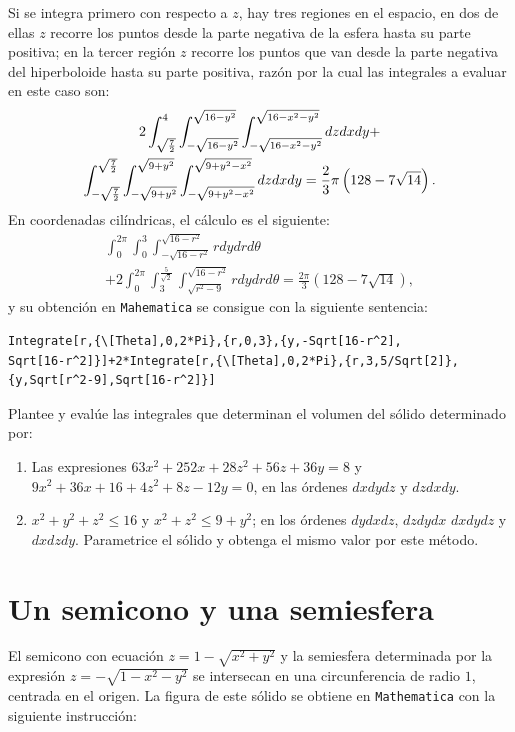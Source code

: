 Si se integra primero con respecto a $z$, hay tres regiones en el espacio, en dos de ellas $z$ recorre los puntos desde la parte negativa de la esfera hasta su parte positiva; en la tercer región $z$ recorre los puntos que van desde la parte negativa del hiperboloide hasta su parte positiva, razón por la cual las integrales a evaluar en este caso son:
\begin{multline*}
2\int_{\sqrt{\frac{7}{2}}}^{4}\int_{-\sqrt{16-y^2}}^{\sqrt{16-y^2}}\int_{-\sqrt{16-x^2-y^2}}^{\sqrt{16-x^2-y^2}}dzdxdy+ \\
\int_{-\sqrt{\frac{7}{2}}}^{\sqrt{\frac{7}{2}}}\int_{-\sqrt{9+y^2}}^{\sqrt{9+y^2}}\int_{-\sqrt{9+y^2-x^2}}^{\sqrt{9+y^2-x^2}}dzdxdy =\frac{2}{3}\pi\left( 128-7\sqrt{14}\right).
\end{multline*}
En coordenadas cilíndricas, el cálculo es el siguiente:
\begin{multline*}
\int_{0}^{2\pi }\int_{0}^{3}\int_{-\sqrt{16-r^2}}^{\sqrt{16-r^2}}rdydrd\theta \\ +2\int_{0}^{2\pi}\int_{3}^{\frac{5}{\sqrt{2}}}\int_{\sqrt{r^2-9}}^{\sqrt{16-r^2}}rdydrd\theta = \frac{2\pi}{3}(128-7 \sqrt{14}),
\end{multline*}
y su obtención en \verb"Mahematica" se consigue con la siguiente sentencia:

\begin{tcolorbox}[title=\bf Instrucción en \verb"Mathematica"]\begin{Verbatim}[formatcom=\letraverbatim]
Integrate[r,{\[Theta],0,2*Pi},{r,0,3},{y,-Sqrt[16-r^2],
Sqrt[16-r^2]}]+2*Integrate[r,{\[Theta],0,2*Pi},{r,3,5/Sqrt[2]},
{y,Sqrt[r^2-9],Sqrt[16-r^2]}]
\end{Verbatim}
\end{tcolorbox}

\begin{ejer}
Plantee y evalúe las integrales que determinan el volumen del sólido determinado por:
\begin{enumerate}
\item Las expresiones $63x^2+252x+28z^2+56z+36y=8$ y $9x^2+36x+16+4z^2+8z-12y=0$, en las órdenes $dxdydz$ y $dzdxdy$.
\item $x^2 + y^2 + z^2 \leq 16$ y $x^2 + z^2 \leq 9 + y^2$; en los órdenes $dydxdz$, $dzdydx$ $dxdydz$ y $dxdzdy$.
Parametrice el sólido y obtenga el mismo valor por este método.
\end{enumerate}
\end{ejer}

\section{Un semicono y una semiesfera} 
El semicono con ecuación $z=1-\sqrt{x^2+y^2}$ y la semiesfera determinada por la expresión
$z=-\sqrt{1-x^2-y^2}$ se intersecan en una circunferencia de radio $1$, centrada en el origen.
La figura de este sólido se obtiene en \verb"Mathematica" con la siguiente instrucción:

